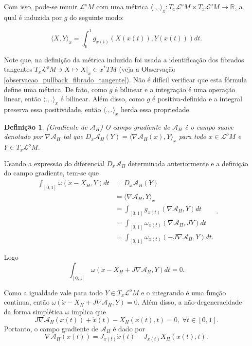 \documentclass[12pt]{book}
\newtheorem{definicao}[teorema]{Definição}
\newcommand{\campohamiltoniano}[1]{X_{H}(#1)}
\newcommand{\campohamiltonianoabrev}{X_{H}}
\newcommand{\espacotangenteponto}[2]{T_{#1}#2}
\newcommand{\funcionalH}{\mathcal{A}_{H}}
\newcommand{\gradientefuncional}{\nabla \funcionalH}
\newcommand{\iprod}[2]{\langle #1, #2 \rangle}
\newcommand{\intervalo}{[0,1]}
\newcommand{\produtointerno}[2]{\langle #1, #2 \rangle}
\newcommand{\pullbackfibradotangente}[2]{#1^{*}T#2}
\newcommand{\real}[1]{\mathbb{R}^{#1}}
\newcommand{\reta}{\real{}}
\newcommand{\lacocontrateis}{\mathcal{L}^{o}M}
\begin{document}
	Com isso, pode-se munir $\lacocontrateis$ com uma métrica $\produtointerno{.}{.}_{x}: \espacotangenteponto{x}{\lacocontrateis} \times \espacotangenteponto{x}{\lacocontrateis} \to \reta$, a qual é induzida por $g$ do seguinte modo:
	
	$$
	\produtointerno{X}{Y}_{x} = \int_{0}^{1}g_{x(t)}(X(x(t)), Y(x(t)))dt.
	$$
	
	Note que, na definição da métrica induzida foi usada a identificação dos fibrados tangentes $\espacotangenteponto{x}{\lacocontrateis} \ni X \mapsto  X|_{x} \in \pullbackfibradotangente{x}{M}$ (veja a Observação \ref{observacao_pullback_fibrado_tangente}). Não é difícil verificar que esta fórmula define uma métrica. De fato, como $g$ é bilinear e a integração é uma operação linear, então $\produtointerno{.}{.}_{x}$ é bilinear. Além disso, como $g$ é positiva-definida e a integral preserva essa positividade, então $\produtointerno{.}{.}_{x}$ herda essa propriedade.
	
	\begin{definicao}
		(Gradiente de $\funcionalH$) O campo gradiente de $\funcionalH$ é o campo suave denotado por $\gradientefuncional$ tal que $D_{x}\funcionalH(Y) = \produtointerno{\gradientefuncional(x)}{Y}_{x}$ para todo $x \in \lacocontrateis$ e $Y \in \espacotangenteponto{x}{\lacocontrateis}$.
	\end{definicao}
	
	Usando a expressão do diferencial $D_{x}\funcionalH$ determinada anteriormente e a definição do campo gradiente, tem-se que
	$$
	\begin{aligned}
	\int_{[0,1]} \omega(\dot{x} - \campohamiltonianoabrev, Y)dt&=
	D_{x}\funcionalH(Y)
	\\ 
	&= \iprod{\gradientefuncional}{Y}_{x}
	\\
	&= \int_{[0,1]}g_{x(t)}(\gradientefuncional, Y)dt
	\\
	&=\int_{[0,1]} \omega_{x(t)}(\gradientefuncional, JY)dt
	\\
	&=\int_{[0,1]} \omega_{x(t)}(-J\gradientefuncional, Y)dt.
	\end{aligned}.
	$$
	
	Logo
	$$
	\int_{[0,1]} \omega(\dot{x} - \campohamiltonianoabrev + J\gradientefuncional, Y)dt = 0.
	$$
	
	Como a igualdade vale para todo $Y \in \espacotangenteponto{x}{\lacocontrateis}$ e o integrando é uma função contínua, então $\omega(\dot{x} - \campohamiltonianoabrev + J\gradientefuncional, Y)=0$. Além disso, a não-degeneracidade da forma simplética $\omega$ implica que
	$$
	J\gradientefuncional(x(t)) +\dot{x}(t)-\campohamiltoniano{x(t), t} = 0, \; \forall t \in \intervalo.
	$$
	Portanto, o campo gradiente de $\funcionalH$ é dado por
	$$
	\gradientefuncional(x(t))= J_{x(t)}\dot{x}(t)-J_{x(t)}\campohamiltoniano{x(t), t}.
	$$
	
\end{document}
